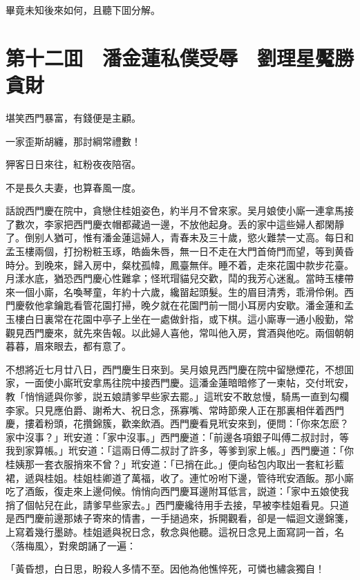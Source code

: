 畢竟未知後來如何，且聽下囬分解。

\chapter*{第十二囬　潘金蓮私僕受辱　劉理星魘勝貪財}

堪笑西門暴富，有錢便是主顧。

一家歪斯胡纏，那討綱常禮數！

狎客日日來往，紅粉夜夜陪宿。

不是長久夫妻，也算春風一度。

話說西門慶在院中，貪戀住桂姐姿色，約半月不曾來家。吴月娘使小廝一連拿馬接了數次，李家把西門慶衣帽都藏過一邊，不放他起身。丢的家中這些婦人都閑靜了。倒别人猶可，惟有潘金蓮這婦人，青春未及三十歲，慾火難禁一丈高。每日和孟玉樓兩個，打扮粉粧玉琢，皓齒朱唇，無一日不走在大門首倚門而望，等到黄昏時分。到晚來，歸入房中，粲枕孤幃，鳳臺無伴。睡不着，走來花園中款步花臺。月漾水底，猶恐西門慶心性難拿；怪玳瑁貓兒交歡，鬦的我芳心迷亂。當時玉樓帶來一個小廝，名喚琴童，年約十六歲，纔㽞起頭髮。生的眉目清秀，乖滑伶俐。西門慶敎他拿鑰匙看管花園打掃，晚夕就在花園門前一間小耳房内安歇。潘金蓮和孟玉樓白日裏常在花園中亭子上坐在一處做針指，或下棋。這小廝專一通小殷勤，常觀見西門慶來，就先來告報。以此婦人喜他，常叫他入房，賞酒與他吃。兩個朝朝暮暮，眉來眼去，都有意了。

不想將近七月廿八日，西門慶生日來到。吴月娘見西門慶在院中留戀煙花，不想囬家，一面使小廝玳安拿馬往院中接西門慶。這潘金蓮暗暗修了一柬帖，交付玳安，教「悄悄遞與你爹，説五娘請爹早些家去罷。」這玳安不敢怠慢，騎馬一直到勾欄李家。只見應伯爵、謝希大、祝日念，孫寡嘴、常時節衆人正在那裏相伴着西門慶，摟着粉頭，花攢錦簇，歡楽飲酒。西門慶看見玳安來到，便問：「你來怎麽？家中沒事？」玳安道：「家中沒事。」西門慶道：「前邊各項銀子叫傅二叔討討，等我到家算帳。」玳安道：「這兩日傅二叔討了許多，等爹到家上帳。」西門慶道：「你桂姨那一套衣服捎來不曾？」玳安道：「已捎在此。」便向毡包内取出一套紅衫藍裙，遞與桂姐。桂姐桂卿道了萬福，收了。連忙吩咐下邊，管待玳安酒飯。那小廝吃了酒飯，復走來上邊伺候。悄悄向西門慶耳邊附耳低言，説道：「家中五娘使我捎了個帖兒在此，請爹早些家去。」西門慶纔待用手去接，早被李桂姐看見。只道是西門慶前邊那婊子寄來的情書，一手撾過來，拆開觀看，卻是一幅迴文邊錦箋，上寫着幾行墨跡。桂姐遞與祝日念，敎念與他聽。這祝日念見上面寫詞一首，名〈落梅風〉，對衆朗誦了一遍：

「黃昏想，白日思，盼殺人多情不至。因他為他憔悴死，可憐也繡衾獨自！

